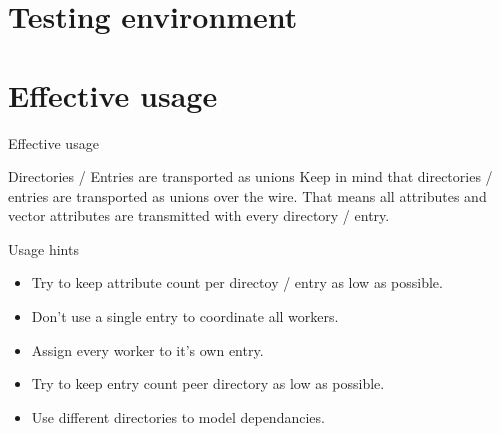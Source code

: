 \documentclass{beamer}
\begin{document}
  \section{Testing environment}
    \begin{frame}
    \end{frame}
    
  \section{Effective usage}
    \begin{frame}{Effective usage}
      \begin{alertblock}{Directories / Entries are transported as unions}
        Keep in mind that directories / entries are transported as unions over the wire. That means 
        all attributes and vector attributes are transmitted with every directory / entry.
      \end{alertblock}
      
      \begin{block}{Usage hints}
        \begin{itemize}
          \item Try to keep attribute count per directoy / entry as low as possible.
          \item Don't use a single entry to coordinate all workers. 
          \item Assign every worker to it's own entry. 
          \item Try to keep entry count peer directory as low as possible.
          \item Use different directories to model dependancies.
          \end{itemize}
       \end{block}
    \end{frame}
    
\end{document}

